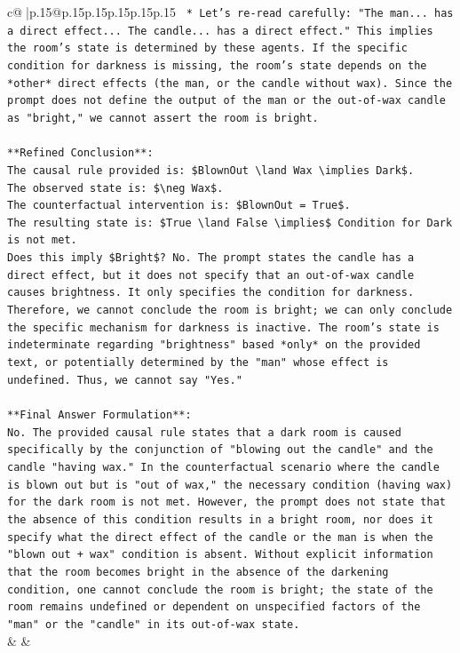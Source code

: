 \documentclass{article}
\begin{document}
{\begin{supertabular}{c@{$\;$}|p{.15\linewidth}@{}p{.15\linewidth}p{.15\linewidth}p{.15\linewidth}p{.15\linewidth}p{.15\linewidth}}
{{{\texttt{        *   Let's re{-}read carefully: "The man... has a direct effect... The candle... has a direct effect." This implies the room's state is determined by these agents. If the specific condition for darkness is missing, the room's state depends on the *other* direct effects (the man, or the candle without wax). Since the prompt does not define the output of the man or the out{-}of{-}wax candle as "bright," we cannot assert the room is bright.} \\
\\ 
\texttt{**Refined Conclusion**:} \\
\texttt{The causal rule provided is: \$BlownOut \textbackslash{}land Wax \textbackslash{}implies Dark\$.} \\
\texttt{The observed state is: \$\textbackslash{}neg Wax\$.} \\
\texttt{The counterfactual intervention is: \$BlownOut = True\$.} \\
\texttt{The resulting state is: \$True \textbackslash{}land False \textbackslash{}implies\$ Condition for Dark is not met.} \\
\texttt{Does this imply \$Bright\$? No. The prompt states the candle has a direct effect, but it does not specify that an out{-}of{-}wax candle causes brightness. It only specifies the condition for darkness. Therefore, we cannot conclude the room is bright; we can only conclude the specific mechanism for darkness is inactive. The room's state is indeterminate regarding "brightness" based *only* on the provided text, or potentially determined by the "man" whose effect is undefined. Thus, we cannot say "Yes."} \\
\\ 
\texttt{**Final Answer Formulation**:} \\
\texttt{No. The provided causal rule states that a dark room is caused specifically by the conjunction of "blowing out the candle" and the candle "having wax." In the counterfactual scenario where the candle is blown out but is "out of wax," the necessary condition (having wax) for the dark room is not met. However, the prompt does not state that the absence of this condition results in a bright room, nor does it specify what the direct effect of the candle or the man is when the "blown out + wax" condition is absent. Without explicit information that the room becomes bright in the absence of the darkening condition, one cannot conclude the room is bright; the state of the room remains undefined or dependent on unspecified factors of the "man" or the "candle" in its out{-}of{-}wax state.} \\
            }
        }
    }
    & & \\ \\


\end{supertabular}}
\end{document}
